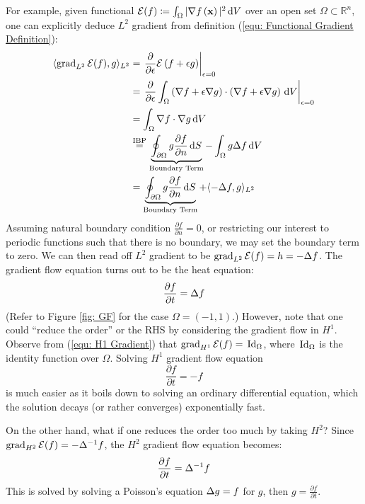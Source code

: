 \documentclass[../dissertation.tex]{subfiles}
\begin{document}
\begin{example}
    For example, given functional $\mathcal{E} (f) \coloneqq \int_{\Omega} |\nabla f \left( \mathbf{x} \right)|^2 \, \text{d} V$ over an open set $\Omega \subset \mathbb{R}^n$,
    one can explicitly deduce $L^2$ gradient from definition (\ref{equ: Functional Gradient Definition}):
    \begin{align*}
        \langle \operatorname{grad}_{L^2} \mathcal{E} (f), g \rangle_{L^2} &= \left.\frac{\partial}{\partial \epsilon} \mathcal{E} \left( f + \epsilon g \right)\right|_{\epsilon=0} \\
            &= \left.\frac{\partial}{\partial \epsilon} \int_{\Omega} \left( \nabla f + \epsilon \nabla g \right) \cdot \left( \nabla f + \epsilon \nabla g \right) \, \text{d} V\right|_{\epsilon=0} \\
                &= \int_{\Omega} \nabla f \cdot \nabla g \, \text{d} V \\
                &\stackrel{\text{IBP}}{=} \underbrace{\oint_{\partial \Omega} g \frac{\partial f}{\partial n} \, \text{d} S}_{\text{Boundary Term}} - \int_{\Omega} g \Delta f \, \text{d} V \\
                &= \underbrace{\oint_{\partial \Omega} g \frac{\partial f}{\partial n} \, \text{d} S}_{\text{Boundary Term}} + \langle -\Delta f, g \rangle_{L^2}
            \end{align*}
            Assuming natural boundary condition $\frac{\partial f}{\partial n} = 0$, or restricting our interest to periodic functions such that there is no boundary, we may set the boundary term to zero.
            We can then read off $L^2$ gradient to be $\operatorname{grad}_{L^2} \mathcal{E} (f) = h = -\Delta f$. 
            The gradient flow equation turns out to be the heat equation:
            \begin{equation}
                \frac{\partial f}{\partial t} = \Delta f
            \end{equation}
            (Refer to Figure \ref{fig: GF} for the case $\Omega = (-1, 1)$.)
            However, note that one could ``reduce the order'' or the RHS by considering the gradient flow in $H^1$.
            Observe from (\ref{equ: H1 Gradient}) that $\operatorname{grad}_{H^1} \mathcal{E} (f) = \, \text{Id}_{\Omega}$, where $\, \text{Id}_{\Omega}$ is the identity function over $\Omega$.
            Solving $H^1$ gradient flow equation
            \begin{equation}
                \frac{\partial f}{\partial t} = -f
    \end{equation}
    is much easier as it boils down to solving an ordinary differential equation,
    which the solution decays (or rather converges) exponentially fast.

    On the other hand, what if one reduces the order too much by taking $H^2$?
    Since $\operatorname{grad}_{H^2} \mathcal{E} (f) = -\Delta^{-1} f$, the $H^2$ gradient flow equation becomes:
    \begin{equation}
        \frac{\partial f}{\partial t} = \Delta^{-1} f
    \end{equation}
    This is solved by solving a Poisson's equation $\Delta g = f$ for $g$,
    then $g = \frac{\partial f}{\partial t}$.
\end{example}
\end{document}

